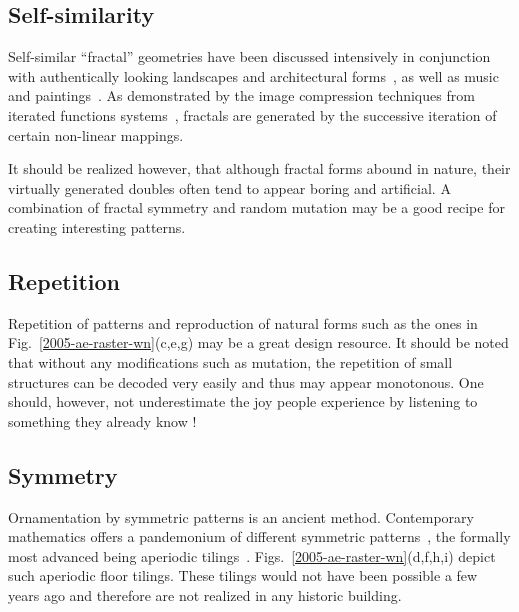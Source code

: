 \documentclass[%
 reprint,
 showpacs,
 showkeys,
 amsmath,
 amssymb,
 aps,
 pra,
 longbibliography,
 floatfix,
 ]{revtex4-1}
\begin{document}
\subsection{Self-similarity}

Self-similar ``fractal'' \cite{mandelbrot-77,mandelbrot-83,falconer1,falconer2}
geometries have been discussed intensively in conjunction with authentically looking landscapes \cite{voss85} and architectural forms~\cite{bovill,jencks},
as well as music~\cite{gard-78} and paintings~\cite{taylor-99}.
As demonstrated by the image compression techniques from iterated functions systems~\cite{barnsley:88},
fractals are generated by the successive iteration of certain non-linear mappings.

It should be realized however, that although fractal forms abound in nature, their virtually generated doubles often tend to appear boring and artificial.
A combination of fractal symmetry and random mutation may be a good recipe for creating interesting patterns.



\subsection{Repetition}

Repetition of patterns and reproduction of natural forms such as the ones in Fig.~\ref{2005-ae-raster-wn}(c,e,g) may be a great design resource.
It should be noted that without any modifications such as mutation, the repetition of small structures can be decoded very easily and thus may appear monotonous.
One should, however, not underestimate the joy people experience by listening to something they already know \cite{feynman-law}!



\subsection{Symmetry}

Ornamentation by symmetric patterns is an ancient method.
Contemporary mathematics offers a pandemonium of different symmetric patterns~\cite{gruenbaum-tiling},
the formally most advanced being aperiodic tilings~\cite{baake-02,grimm-schr-02}.
Figs.~\ref{2005-ae-raster-wn}(d,f,h,i) depict such aperiodic floor tilings.
These tilings would not have been possible a few years ago and therefore are not realized in any historic building.



\end{document}
